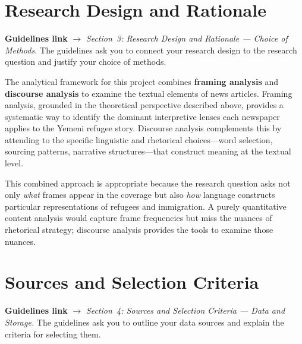 \documentclass[11pt,a4paper]{article}
\begin{document}
\section{Research Design and Rationale}

\begin{crossrefbox}
\textbf{Guidelines link} $\rightarrow$ \textit{Section~3: Research Design and Rationale --- Choice of Methods.} The guidelines ask you to connect your research design to the research question and justify your choice of methods.
\end{crossrefbox}

\medskip

The analytical framework for this project combines \textbf{framing analysis} and \textbf{discourse analysis} to examine the textual elements of news articles. Framing analysis, grounded in the theoretical perspective described above, provides a systematic way to identify the dominant interpretive lenses each newspaper applies to the Yemeni refugee story. Discourse analysis complements this by attending to the specific linguistic and rhetorical choices---word selection, sourcing patterns, narrative structures---that construct meaning at the textual level.

This combined approach is appropriate because the research question asks not only \textit{what} frames appear in the coverage but also \textit{how} language constructs particular representations of refugees and immigration. A purely quantitative content analysis would capture frame frequencies but miss the nuances of rhetorical strategy; discourse analysis provides the tools to examine those nuances.


\section{Sources and Selection Criteria}

\begin{crossrefbox}
\textbf{Guidelines link} $\rightarrow$ \textit{Section~4: Sources and Selection Criteria --- Data and Storage.} The guidelines ask you to outline your data sources and explain the criteria for selecting them.
\end{crossrefbox}

\medskip
\end{document}
